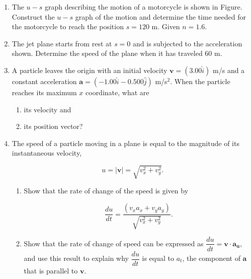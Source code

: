 \documentclass{article}
\renewcommand{\frac}[2]{\dfrac{#1}{#2}}
\begin{document}
\begin{enumerate}
    \item The \( u-s \) graph describing the motion of a motorcycle is shown in Figure. Construct the \( u-s \) graph of the motion and determine the time needed for the motorcycle to reach the position \( s = 120 \) m. Given \( n = 1.6 \).
    \begin{center}
    \end{center}
    
    \item The jet plane starts from rest at \( s = 0 \) and is subjected to the acceleration shown. Determine the speed of the plane when it has traveled 60 m.
    \begin{center}
    \end{center}
    
    \item A particle leaves the origin with an initial velocity \( \mathbf{v} = (3.00\hat{i}) \) m/s and a constant acceleration \( \mathbf{a} = (-1.00\hat{i} - 0.500\hat{j}) \) m/s\(^2\). When the particle reaches its maximum \( x \) coordinate, what are
    \begin{enumerate}
        \item its velocity and 
        \item its position vector?
    \end{enumerate}
    
    \item The speed of a particle moving in a plane is equal to the magnitude of its instantaneous velocity,
    
    \[ u = | \mathbf{v} | = \sqrt{v_x^2 + v_y^2}. \]
    \begin{enumerate}
        \item Show that the rate of change of the speed is given by
    
        \[ \frac{du}{dt} = \frac{(v_xa_x + v_ya_y)}{\sqrt{v_x^2 + v_y^2}}. \]
    
        \item Show that the rate of change of speed can be expressed as \( \frac{du}{dt} = \mathbf{v} \cdot \mathbf{a_u} \), and use this result to explain why \( \frac{du}{dt} \) is equal to \( a_t \), the component of \( \mathbf{a} \) that is parallel to \( \mathbf{v} \).
    \end{enumerate}
    

\end{enumerate}
\end{document}
